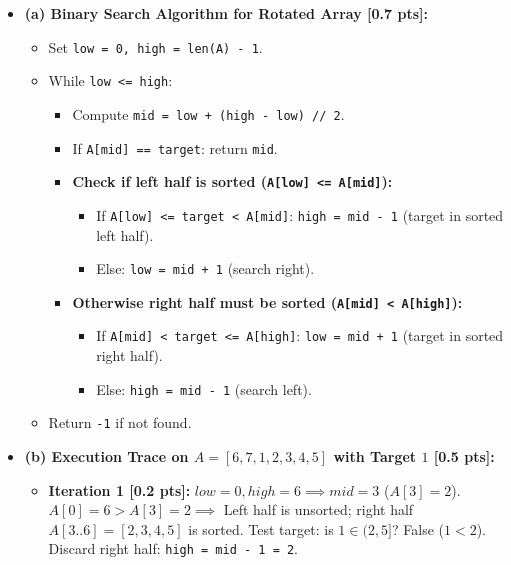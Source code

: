 \documentclass[11pt,a4paper]{article}
\begin{document}
\begin{solutionbox}
\begin{itemize}
    \item \textbf{(a) Binary Search Algorithm for Rotated Array [0.7 pts]:}
    \begin{itemize}
        \item Set \texttt{low = 0, high = len(A) - 1}.
        \item While \texttt{low <= high}:
        \begin{itemize}
            \item Compute \texttt{mid = low + (high - low) // 2}.
            \item If \texttt{A[mid] == target}: return \texttt{mid}.
            \item \textbf{Check if left half is sorted (\texttt{A[low] <= A[mid]}):}
            \begin{itemize}
                \item If \texttt{A[low] <= target < A[mid]}: \texttt{high = mid - 1} (target in sorted left half).
                \item Else: \texttt{low = mid + 1} (search right).
            \end{itemize}
            \item \textbf{Otherwise right half must be sorted (\texttt{A[mid] < A[high]}):}
            \begin{itemize}
                \item If \texttt{A[mid] < target <= A[high]}: \texttt{low = mid + 1} (target in sorted right half).
                \item Else: \texttt{high = mid - 1} (search left).
            \end{itemize}
        \end{itemize}
        \item Return \texttt{-1} if not found.
    \end{itemize}
    \item \textbf{(b) Execution Trace on $A = [6, 7, 1, 2, 3, 4, 5]$ with Target $1$ [0.5 pts]:}
    \begin{itemize}
        \item \textbf{Iteration 1 [0.2 pts]:} $low = 0, high = 6 \implies mid = 3$ ($A[3] = 2$).
        $A[0] = 6 > A[3] = 2 \implies$ Left half is unsorted; right half $A[3..6] = [2, 3, 4, 5]$ is sorted.
        Test target: is $1 \in (2, 5]$? False ($1 < 2$). Discard right half: \texttt{high = mid - 1 = 2}.

\end{itemize}
\end{itemize}
\end{solutionbox}
\end{document}
